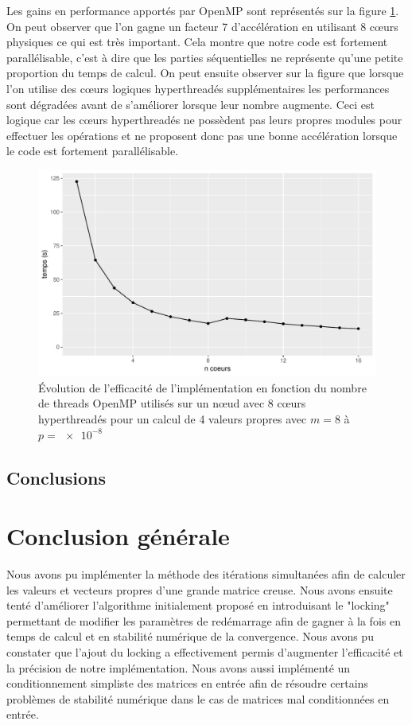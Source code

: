 \documentclass[11pt,a4paper]{article}
\begin{document}
			Les gains en performance apportés par OpenMP sont représentés sur la figure \ref{fig:omp_perf}. On peut observer que l'on gagne un facteur 7 d'accélération en utilisant 8 cœurs physiques ce qui est très important. Cela montre que notre code est fortement parallélisable, c'est à dire que les parties séquentielles ne représente qu'une petite proportion du temps de calcul. On peut ensuite observer sur la figure que lorsque l'on utilise des cœurs logiques hyperthreadés supplémentaires les performances sont dégradées avant de s'améliorer lorsque leur nombre augmente. Ceci est logique car les cœurs hyperthreadés ne possèdent pas leurs propres modules pour effectuer les opérations et ne proposent donc pas une bonne accélération lorsque le code est fortement parallélisable.

			\begin{figure}
				\includegraphics[width=\linewidth]{plots/omp_perf.pdf}
				\caption{Évolution de l'efficacité de l'implémentation en fonction du nombre de threads OpenMP utilisés sur un nœud avec 8 cœurs hyperthreadés pour un calcul de 4 valeurs propres avec $m = 8$ à $p=\SI{e-8}{}$ \label{fig:omp_perf}}
			\end{figure}
	\subsection{Conclusions}

\section{Conclusion générale}

	Nous avons pu implémenter la méthode des itérations simultanées afin de calculer les valeurs et vecteurs propres d'une grande matrice creuse. Nous avons ensuite tenté d'améliorer l'algorithme initialement proposé en introduisant le "locking" permettant de modifier les paramètres de redémarrage afin de gagner à la fois en temps de calcul et en stabilité numérique de la convergence. Nous avons pu constater que l'ajout du locking a effectivement permis d'augmenter l'efficacité et la précision de notre implémentation. Nous avons aussi implémenté un conditionnement simpliste des matrices en entrée afin de résoudre certains problèmes de stabilité numérique dans le cas de matrices mal conditionnées en entrée.
\end{document}
